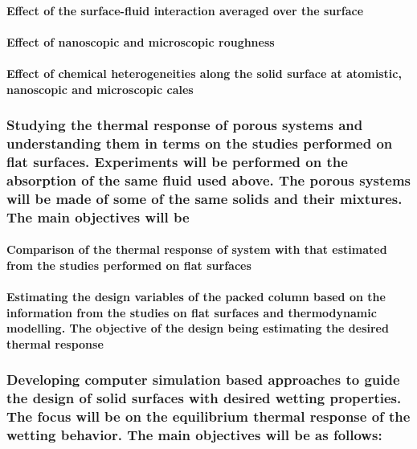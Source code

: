 \documentclass[a4paper,12pt,single,pdftex]{scrartcl}
\begin{document}
\label{ID_609905923}\paragraph{Effect of the surface-fluid interaction averaged over the surface}

\label{ID_589844027}\paragraph{Effect of nanoscopic and microscopic roughness}

\label{ID_1898685670}\paragraph{Effect of chemical heterogeneities along the solid surface at atomistic, nanoscopic and microscopic cales}

\label{ID_1074266462}\subsubsection{Studying the thermal response of porous systems and understanding them in terms on the studies performed on flat surfaces. Experiments will be performed on the absorption of the same fluid used above. The porous systems will be made of some of the same solids and their mixtures. The main objectives will be}

\label{ID_725380065}\paragraph{Comparison of the thermal response of system with that estimated from the studies performed on flat surfaces}

\label{ID_322656915}\paragraph{Estimating the design variables of the packed column based on the information from the studies on flat surfaces and thermodynamic modelling. The objective of the design being estimating the desired thermal response}

\label{ID_1058727089}\subsubsection{Developing computer simulation based approaches to guide the design of solid surfaces with desired wetting properties. The focus will be on the equilibrium thermal response of the wetting behavior. The main objectives will be as follows:}
\end{document}
